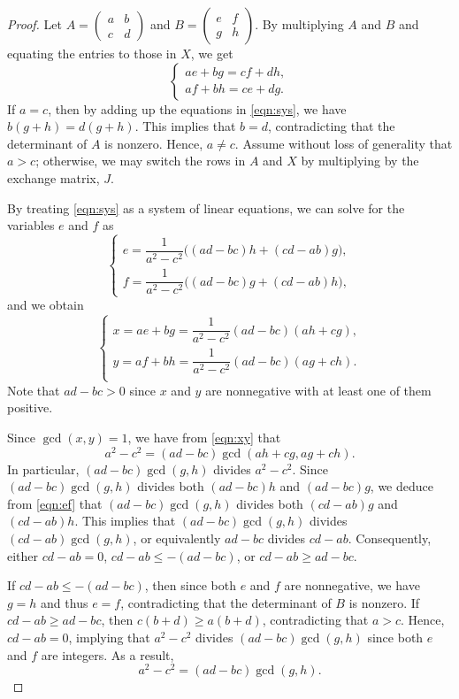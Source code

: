 \documentclass{amsart}
\newcommand{\pmx}[4]{\begin{pmatrix} #1 & #2 \\ #3 & #4 \end{pmatrix}}
\begin{document}
\begin{proof}
Let $A=\pmx{a}{b}{c}{d}$ and $B=\pmx{e}{f}{g}{h}$. By multiplying $A$ and $B$ and equating the entries to those in $X$, we get
\begin{equation}\label{eqn:sys}
\begin{cases}
ae+bg=cf+dh,\\
af+bh=ce+dg.
\end{cases}
\end{equation}
If $a=c$, then by adding up the equations in \eqref{eqn:sys}, we have $b(g+h)=d(g+h)$. This implies that $b=d$, contradicting that the determinant of $A$ is nonzero. Hence, $a\neq c$. Assume without loss of generality that $a>c$; otherwise, we may switch the rows in $A$ and $X$ by multiplying by the exchange matrix, $J$. 

By treating \eqref{eqn:sys} as a system of linear equations, we can solve for the variables $e$ and $f$ as
\begin{equation}\label{eqn:ef}
\begin{cases}
e=\dfrac{1}{a^2-c^2}\big((ad-bc)h+(cd-ab)g\big),\\
f=\dfrac{1}{a^2-c^2}\big((ad-bc)g+(cd-ab)h\big),
\end{cases}
\end{equation}
and we obtain
\begin{equation}\label{eqn:xy}
\begin{cases}
x=ae+bg=\dfrac{1}{a^2-c^2}(ad-bc)(ah+cg),\\
y=af+bh=\dfrac{1}{a^2-c^2}(ad-bc)(ag+ch).\\
\end{cases}
\end{equation}
Note that $ad-bc>0$ since $x$ and $y$ are nonnegative with at least one of them positive.

Since $\gcd(x,y)=1$, we have from \eqref{eqn:xy} that
\begin{equation}\label{eqn:a^2-c^2first}
a^2-c^2=(ad-bc)\gcd(ah+cg,ag+ch).
\end{equation}
In particular, $(ad-bc)\gcd(g,h)$ divides $a^2-c^2$. Since $(ad-bc)\gcd(g,h)$ divides both $(ad-bc)h$ and $(ad-bc)g$, we deduce from \eqref{eqn:ef} that $(ad-bc)\gcd(g,h)$ divides both $(cd-ab)g$ and $(cd-ab)h$. This implies that $(ad-bc)\gcd(g,h)$ divides $(cd-ab)\gcd(g,h)$, or equivalently $ad-bc$ divides $cd-ab$. Consequently, either $cd-ab=0$, $cd-ab\leq-(ad-bc)$, or $cd-ab\geq ad-bc$.

If $cd-ab\leq-(ad-bc)$, then since both $e$ and $f$ are nonnegative, we have $g=h$ and thus $e=f$, contradicting that the determinant of $B$ is nonzero. If $cd-ab\geq ad-bc$, then $c(b+d)\geq a(b+d)$, contradicting that $a>c$. Hence, $cd-ab=0$, implying that $a^2-c^2$ divides $(ad-bc)\gcd(g,h)$ since both $e$ and $f$ are integers. As a result,
\begin{equation}\label{eqn:a^2-c^2second}
a^2-c^2=(ad-bc)\gcd(g,h).
\end{equation}


\end{proof}
\end{document}
